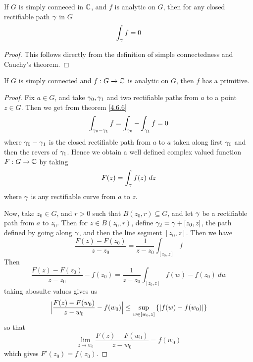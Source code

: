 \begin{theorem}\label{4.6.7}
    If $G$ is simply conneced in  $\mathbb{C}$, and  $f$ is analytic on $G$, then for
    any closed rectifiable path $\gamma$ in  $G$
    \begin{equation*}
        \int_\gamma{f}=0
    \end{equation*}
\end{theorem}
\begin{proof}
    This follows directly from the definition of simple connectedness and
    Cauchy's theorem.
\end{proof}
\begin{corollary}
    If $G$ is simply connected and  $f:G \xrightarrow{} \mathbb{C}$ is analytic on $G$,
    then  $f$ has a primitive.
\end{corollary}
\begin{proof}
    Fix $a \in G$, and take  $\gamma_0,\gamma_1$ and two rectifiable paths from $a$ to a
    point  $z \in G$. Then we get from theorem \ref{4.6.6}
    \begin{equation*}
        \int_{\gamma_0-\gamma_1}{f}=\int_{\gamma_0}-\int_{\gamma_1}{f}=0
    \end{equation*}
    where $\gamma_0-\gamma_1$ is the closed rectifiable path from $a$ to  $a$ taken
    along first $\gamma_0$ and then the revers of $\gamma_1$. Hence we obtain a well
    defined complex valued function $F:G \xrightarrow{} \mathbb{C}$ by taking
    \begin{equation*}
        F(z)=\int_\gamma{f(z) \ dz}
    \end{equation*}
    where $\gamma$ is any rectifiable curve from $a$ to $z$.

    Now, take  $z_0 \in G$, and $r>0$ such that $B(z_0,r) \subseteq G$, and let
    $\gamma$ be a rectifiable path from  $a$ to $z_0$. Then for $z \in B(z_0,r)$,
    define $\gamma_2=\gamma+[z_0,z]$, the path defined by going along $\gamma$, and then the
    line segment $[z_0,z]$. Then we have
    \begin{equation*}
        \frac{F(z)-F(z_0)}{z-z_0}=\frac{1}{z-z_0}\int_{[z_0,z]}{f}
    \end{equation*}
    Then
    \begin{equation*}
        \frac{F(z)-F(z_0)}{z-z_0}-f(z_0)=\frac{1}{z-z_0}\int_{[z_0,z]}{f(w)-f(z_0)
        \ dw}
    \end{equation*}
        taking abosulte values gives us
    \begin{equation*}
        \Big{|}\frac{F(z)-F(w_0)}{z-w_0}-f(w_0)\Big{|} \leq
        \sup_{w \in [w_0,z]}{\{|f(w)-f(w_0)|\}}
    \end{equation*}
    so that
    \begin{equation*}
        \lim_{z \xrightarrow{} w_0}{\frac{F(z)-F(w_0)}{z-w_0}}=f(w_0)
    \end{equation*}
    which gives $F'(z_0)=f(z_0)$.
\end{proof}
